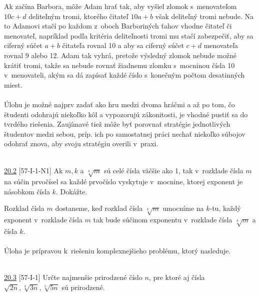 Ak začína Barbora, môže Adam hrať tak, aby vyšiel zlomok s~menovateľom $10c+d$ deliteľným tromi, ktorého čitateľ $10a + b$ však deliteľný tromi nebude. Na to Adamovi stačí po každom z~oboch Barboriných ťahov vhodne  čitateľ či menovateľ, napríklad podľa kritéria deliteľnosti tromi mu stačí zabezpečiť, aby sa ciferný súčet $a+b$ čitateľa rovnal 10 a aby sa ciferný súčet $c+d$ menovateľa rovnal 9 alebo 12. Adam tak vyhrá, pretože výsledný zlomok nebude možné krátiť tromi, takže sa nebude rovnať žiadnemu zlomku s~mocninou čísla 10 v~menovateli, akým sa dá zapísať každé číslo s~konečným počtom desatinných miest.\\
\\
\kom Úlohu je možné najprv zadať ako hru medzi dvoma hráčmi a až po tom, čo študenti odohrajú niekoľko kôl a vypozorujú zákonitosti, je vhodné pustiť sa do tvrdého riešenia. Zaujímavé tiež môže byť porovnať stratégie jednotlivých študentov medzi sebou, príp. ich po samostatnej práci nechať niekoľko súbojov odohrať znova, aby svoju stratégiu overili v~praxi.\\
\\
\begin{tcolorbox}[breakable,notitle,boxrule=0pt,colback=light-gray,colframe=light-gray]\ul{20.2} [57-I-1-N1] Ak $m, k$ a $\sqrt[k]{m}$ sú celé čísla väčšie ako 1, tak v~rozklade čísla $m$ na súčin prvočísel sa každé prvočíslo vyskytuje v~mocnine, ktorej exponent je násobkom čísla $k$. Dokážte.

\end{tcolorbox}

\rieh Rozklad čísla $m$ dostaneme, keď rozklad čísla $\sqrt[k]{m}$ umocníme na $k$-tu, každý exponent v~rozklade čísla $m$ tak bude súčinom exponentu v~rozklade čísla $\sqrt[k]{m}$ a čísla $k$. \\ %
\\
\kom Úloha je prípravou k~riešeniu komplexnejšieho problému, ktorý nasleduje.\\
\\
\begin{tcolorbox}[breakable,notitle,boxrule=0pt,colback=light-gray,colframe=light-gray]\ul{20.3} [57-I-1]
Určte najmenšie prirodzené číslo $n$, pre ktoré aj čísla
$\sqrt{2n}, \sqrt[3]{3n}, \sqrt[5]{5n}$ sú prirodzené.

\end{tcolorbox}

